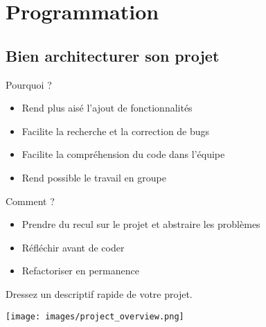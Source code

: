 
\section{Programmation}

\subsection{Bien architecturer son projet}

\begin{frame}
    \begin{block}{Pourquoi ?}
        \begin{itemize}
            \item Rend plus aisé l'ajout de fonctionnalités
            \item Facilite la recherche et la correction de bugs
            \item Facilite la compréhension du code dans l'équipe
            \item Rend possible le travail en groupe
        \end{itemize}
    \end{block}
\end{frame}


\begin{frame}
    \begin{block}{Comment ?}
        \begin{itemize}
            \item Prendre du recul sur le projet et abstraire les problèmes
            \item Réfléchir avant de coder
            \item Refactoriser en permanence
        \end{itemize}
    \end{block}
\end{frame}

\begin{frame}
  Dressez un descriptif rapide de votre projet.
  \begin{center}
    \texttt{[image: images/project\_overview.png]}
  \end{center}
\end{frame}
